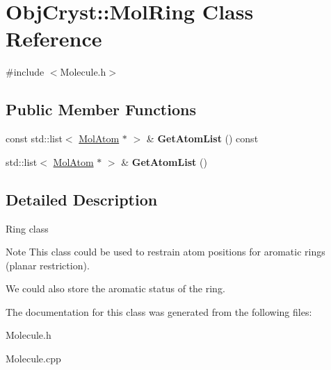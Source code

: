 \hypertarget{class_obj_cryst_1_1_mol_ring}{}\section{Obj\+Cryst\+::Mol\+Ring Class Reference}
\label{class_obj_cryst_1_1_mol_ring}


{\ttfamily \#include $<$Molecule.\+h$>$}

\subsection*{Public Member Functions}
\begin{DoxyCompactItemize}
\item 
\mbox{\label{class_obj_cryst_1_1_mol_ring_ace7b78471b4f26b0f36764df54b7b110}} 
const std\+::list$<$ \mbox{\hyperlink{class_obj_cryst_1_1_mol_atom}{Mol\+Atom}} $\ast$ $>$ \& {\bfseries Get\+Atom\+List} () const
\item 
\mbox{\label{class_obj_cryst_1_1_mol_ring_abe4825a23c4489ca96bf83ae2bf62d30}} 
std\+::list$<$ \mbox{\hyperlink{class_obj_cryst_1_1_mol_atom}{Mol\+Atom}} $\ast$ $>$ \& {\bfseries Get\+Atom\+List} ()
\end{DoxyCompactItemize}


\subsection{Detailed Description}
Ring class

\begin{DoxyNote}{Note}
This class could be used to restrain atom positions for aromatic rings (planar restriction). 

We could also store the aromatic status of the ring. 
\end{DoxyNote}


The documentation for this class was generated from the following files\+:\begin{DoxyCompactItemize}
\item 
Molecule.\+h\item 
Molecule.\+cpp\end{DoxyCompactItemize}
